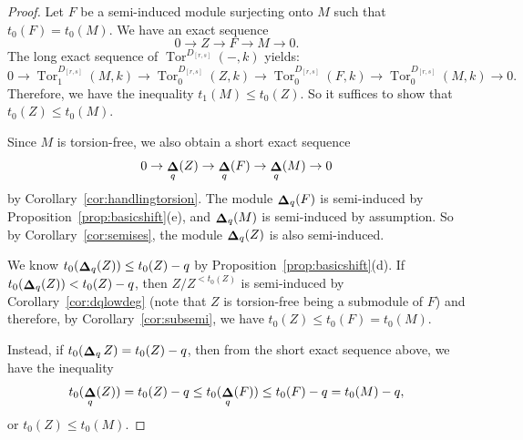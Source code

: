 \documentclass[12pt]{amsart}
\DeclareMathOperator{\Tor}{Tor}
\DeclareMathOperator{\De}{\bf{\Delta}}
\newcommand{\Drs}{D_{[r,s]}}
\newcommand{\mDeq}{\De_{q}}
\numberwithin{equation}{section}
\theoremstyle{definition}
\theoremstyle{plain}
\begin{document}
\begin{proof}
     Let $F$ be a semi-induced module surjecting onto $M$ such that $t_0(F) = t_0(M)$. We have an exact sequence 
     \begin{displaymath}
     0 \to Z \to F \to M \to 0. 
     \end{displaymath}
     The long exact sequence of $\Tor^{\Drs}(-, k)$ yields:
    \begin{displaymath}
    0 \to \Tor_1^{\Drs}(M, k) \to \Tor_0^{\Drs}(Z, k) \to \Tor_0^{\Drs}(F, k) \to \Tor_0^{\Drs}(M, k) \to 0. 
    \end{displaymath}
    Therefore, we have the inequality $t_1(M) \le t_0(Z)$. So it suffices to show that $t_0(Z) \le t_0(M)$.
    
    Since $M$ is torsion-free, we also obtain a short exact sequence 
    \begin{displaymath}
    0 \to \mDeq(Z) \to \mDeq(F) \to \mDeq(M) \to 0
    \end{displaymath}
    by Corollary~\ref{cor:handlingtorsion}. The module $\mDeq(F)$ is semi-induced by Proposition~\ref{prop:basicshift}(e), and $\mDeq(M)$ is semi-induced by assumption. So by Corollary~\ref{cor:semises}, the module $\mDeq(Z)$ is also semi-induced.
    
    We know $t_0(\mDeq(Z)) \le t_0(Z) - q$ by Proposition~\ref{prop:basicshift}(d). If $t_0(\mDeq(Z)) < t_0(Z) - q$, then $Z/Z^{< t_0(Z)}$ is semi-induced by Corollary~\ref{cor:dqlowdeg} (note that $Z$ is torsion-free being a submodule of $F$) and therefore, by Corollary~\ref{cor:subsemi}, we have $t_0(Z) \leq t_0(F) = t_0(M)$. 
    
    Instead, if $t_0(\mDeq Z) = t_0(Z) - q$, then from the short exact sequence above, we have the inequality 
    \begin{displaymath}
    t_0(\mDeq(Z)) = t_0(Z) - q \le t_0(\mDeq(F)) \le t_0(F) - q = t_0(M) - q,
    \end{displaymath}
    or $t_0(Z) \le t_0(M)$. 
\end{proof}
\end{document}
